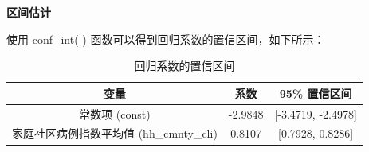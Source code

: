 \documentclass[UTF8,ctexart,a4paper,11pt,openany]{article}
\theoremstyle{definition}
\begin{document}
    \par
    \noindent \textbf{区间估计}
    \par
    使用 conf\_int( ) 函数可以得到回归系数的置信区间，如下所示：
    \begin{table}[H]
    \centering
    \begin{tabular}{|c|c|c|}
    \hline
    \textbf{变量} & \textbf{系数} & \textbf{95\% 置信区间} \\
    \hline
    常数项 (const) & -2.9848 & [-3.4719, -2.4978] \\
    \hline
    家庭社区病例指数平均值 (hh\_cmnty\_cli) & 0.8107 & [0.7928, 0.8286] \\
    \hline
    \end{tabular}
    \caption{回归系数的置信区间}
    \label{tab:conf_int}
    \end{table}
\end{document}
